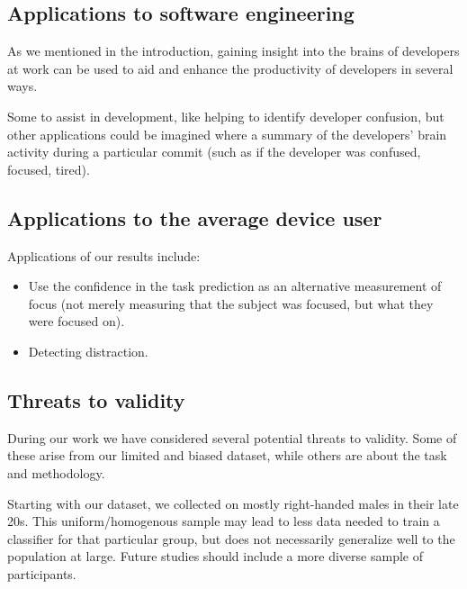 
\subsection{Applications to software engineering}

As we mentioned in the introduction, gaining insight into the brains of developers at work can be used to aid and enhance the productivity of developers in several ways.

Some to assist in development, like helping to identify developer confusion, but other applications could be imagined where a summary of the developers' brain activity during a particular commit (such as if the developer was confused, focused, tired).


\subsection{Applications to the average device user}


Applications of our results include:

\begin{itemize}
    \item Use the confidence in the task prediction as an alternative measurement of focus (not merely measuring that the subject was focused, but what they were focused on). 
    \item Detecting distraction.
\end{itemize}

\subsection{Threats to validity}\label{section:threats}

    During our work we have considered several potential threats to validity. Some of these arise from our limited and biased dataset, while others are about the task and methodology.

    Starting with our dataset, we collected on mostly right-handed males in their late 20s. This uniform/homogenous sample may lead to less data needed to train a classifier for that particular group, but does not necessarily generalize well to the population at large. Future studies should include a more diverse sample of participants.

